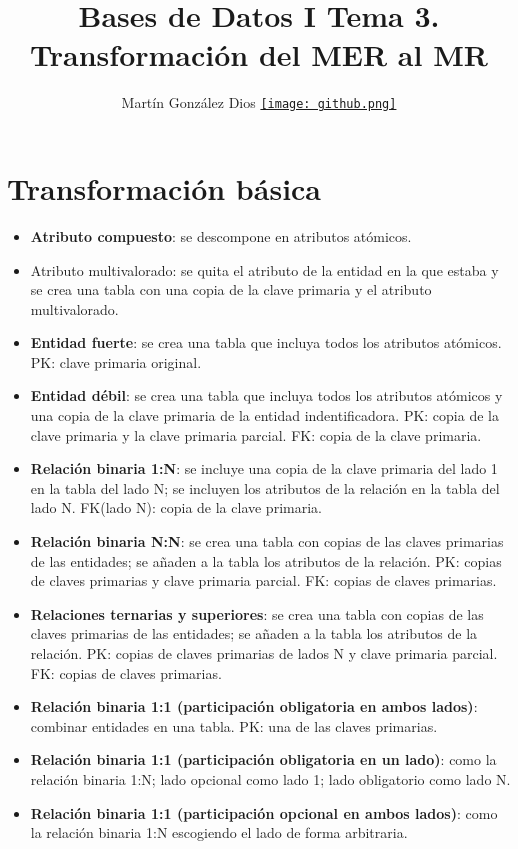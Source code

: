 \documentclass{article}
\title{Bases de Datos I Tema 3. Transformación del MER al MR}
\author{Martín González Dios 
\href{https://github.com/martindios}{\texttt{[image: github.png]}}}
\begin{document}
\maketitle

\section{Transformación básica}
\begin{itemize}
    \item \textbf{Atributo compuesto}: se descompone en atributos atómicos.

    \item Atributo multivalorado: se quita el atributo de la entidad en la que estaba y se crea una tabla con una copia de la clave primaria y el atributo multivalorado.

    \item \textbf{Entidad fuerte}: se crea una tabla que incluya todos los atributos atómicos. PK: clave primaria original.

    \item \textbf{Entidad débil}: se crea una tabla que incluya todos los atributos atómicos y una copia de la clave primaria de la entidad indentificadora. PK: copia de la clave primaria y la clave primaria parcial. FK: copia de la clave primaria.

    \item \textbf{Relación binaria 1:N}: se incluye una copia de la clave primaria del lado 1 en la tabla del lado N; se incluyen los atributos de la relación en la tabla del lado N. FK(lado N): copia de la clave primaria.

    \item \textbf{Relación binaria N:N}: se crea una tabla con copias de las claves primarias de las entidades; se añaden a la tabla los atributos de la relación. PK: copias de claves primarias y clave primaria parcial. FK: copias de claves primarias.

    \item \textbf{Relaciones ternarias y superiores}: se crea una tabla con copias de las claves primarias de las entidades; se añaden a la tabla los atributos de la relación. PK: copias de claves primarias de lados N y clave primaria parcial. FK: copias de claves primarias.

    \item \textbf{Relación binaria 1:1 (participación obligatoria en ambos lados)}: combinar entidades en una tabla. PK: una de las claves primarias.

    \item \textbf{Relación binaria 1:1 (participación obligatoria en un lado)}: como la relación binaria 1:N; lado opcional como lado 1; lado obligatorio como lado N.

    \item \textbf{Relación binaria 1:1 (participación opcional en ambos lados)}: como la relación binaria 1:N escogiendo el lado de forma arbitraria.
\end{itemize}
\end{document}
